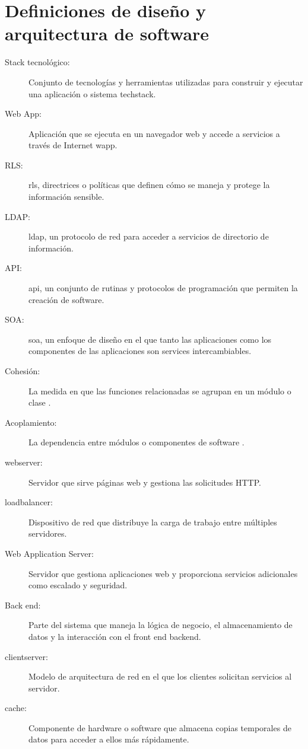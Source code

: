 \section{Definiciones de diseño y arquitectura de software}

\begin{description}

    \item [Stack tecnológico:] Conjunto de tecnologías y herramientas utilizadas para construir y ejecutar una aplicación o sistema \gls{techstack}.
    \item [Web App:] Aplicación que se ejecuta en un navegador web y accede a servicios a través de Internet \gls{wapp}.
    \item [RLS:] \gls{rls}, directrices o políticas que definen cómo se maneja y protege la información sensible.
    \item [LDAP:] \gls{ldap}, un protocolo de red para acceder a servicios de directorio de información.
    \item [API:] \gls{api}, un conjunto de rutinas y protocolos de programación que permiten la creación de software.
    \item [SOA:] \gls{soa}, un enfoque de diseño en el que tanto las aplicaciones como los componentes de las aplicaciones son services intercambiables.
    \item [Cohesión:] La medida en que las funciones relacionadas se agrupan en un módulo o clase \cite{yourdon1979}.
    \item [Acoplamiento:] La dependencia entre módulos o componentes de software \cite{yourdon1979}.
    \item [\Gls{webserver}:] Servidor que sirve páginas web y gestiona las solicitudes HTTP.
    \item [\Gls{loadbalancer}:] Dispositivo de red que distribuye la carga de trabajo entre múltiples servidores.
    \item [Web Application Server:] Servidor que gestiona aplicaciones web y proporciona servicios adicionales como escalado y seguridad.
    \item [Back end:] Parte del sistema que maneja la lógica de negocio, el almacenamiento de datos y la interacción con el front end \gls{backend}.
    \item [\Gls{clientserver}:] Modelo de arquitectura de red en el que los clientes solicitan servicios al servidor.
    \item [\Gls{cache}:] Componente de hardware o software que almacena copias temporales de datos para acceder a ellos más rápidamente.

\end{description}

